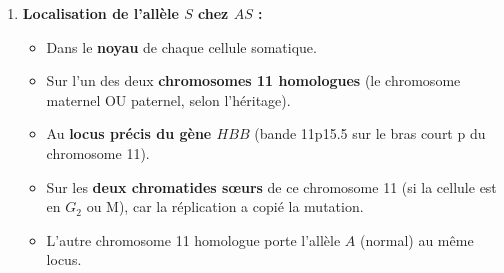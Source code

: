 \documentclass[11pt]{article}
\begin{document}
\begin{exoresolu}
\begin{enumerate}
\begin{enumerate}
            \item \textbf{Biochimie/Cellulaire :} En condition de faible $\ce{O2}$ (hypoxie), la Valine hydrophobe s'insère dans une poche hydrophobe d'une autre molécule d'hémoglobine $\rightarrow$ \textbf{Polymérisation de l'HbS} en fibres rigides $\rightarrow$ \textbf{Déformation du globule rouge} en forme de faucille (drépanocyte) $\rightarrow$ Rigidité, hémolyse, vaso-occlusion.
            \item \textbf{Caractère (Phénotype) :} Anémie hémolytique chronique, crises vaso-occlusives douloureuses, sensibilité aux infections. L'hétérozygote $AS$ (porteur sain) a un avantage sélectif contre le paludisme (sélection équilibrante, pertinent au Cameroun).
        \end{enumerate}
    \item \textbf{Localisation de l'allèle $S$ chez $AS$ :}
        \begin{itemize}
            \item Dans le \textbf{noyau} de chaque cellule somatique.
            \item Sur l'un des deux \textbf{chromosomes 11 homologues} (le chromosome maternel OU paternel, selon l'héritage).
            \item Au \textbf{locus précis du gène $HBB$} (bande 11p15.5 sur le bras court p du chromosome 11).
            \item Sur les \textbf{deux chromatides sœurs} de ce chromosome 11 (si la cellule est en $G_2$ ou M), car la réplication a copié la mutation.
            \item L'autre chromosome 11 homologue porte l'allèle $A$ (normal) au même locus.
        \end{itemize}
\end{enumerate}
\end{exoresolu}
\end{document}
